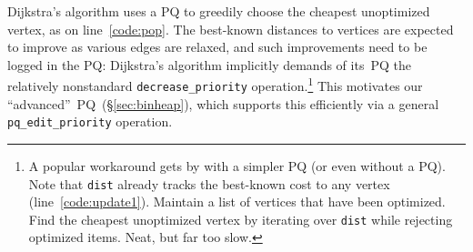 
Dijkstra's algorithm uses a PQ to greedily choose the 
cheapest unoptimized vertex, as on line~\ref{code:pop}. The 
best-known distances to vertices are expected to improve as 
various edges are relaxed, and such improvements need to be logged in the PQ:
Dijkstra's algorithm implicitly demands of its~PQ the relatively 
nonstandard \texttt{decrease\_priority} 
operation.\footnote{A popular \cite{blah,blah,blah} 
workaround gets by with a simpler PQ (or even without a PQ).  
Note that \texttt{dist} already tracks the best-known cost 
to any vertex (line~\ref{code:update1}). Maintain a list of  
vertices that have been optimized. 
Find the cheapest unoptimized vertex by 
iterating over \texttt{dist} while rejecting optimized items. 
Neat, but far too slow.}
This motivates our ``advanced''~PQ~(\S\ref{sec:binheap}),
which supports this efficiently via a general \texttt{pq\_edit\_priority} operation.


